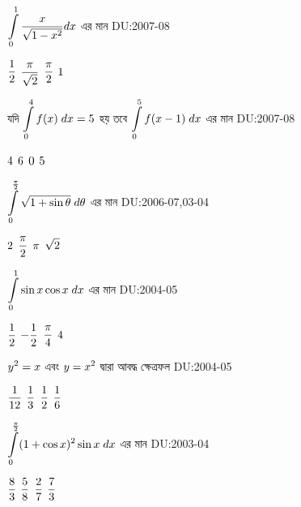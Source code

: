 \documentclass[addpoints]{exam}
\begin{document}
\begin{questions}
\question   $\mathlarger{\int\limits_{0}^{1} \frac{x}{\sqrt{1-x^2}}dx}$  এর মান  \hfill \textsc{DU:2007-08}

\begin{oneparchoices}
 \choice $\mathlarger{\frac{1}{2}}$
 \choice $\mathlarger{\frac{\pi}{\sqrt{2}}}$
\choice $\mathlarger{\frac{\pi}{2}}$
\choice $\mathlarger{1}$
\end{oneparchoices}

\question  যদি $\mathlarger{\int\limits_{0}^{4} f(x)\;dx=5}$  হয় তবে  $\mathlarger{\int\limits_{0}^{5} f(x-1)\;dx}$ এর মান  \hfill \textsc{DU:2007-08}

\begin{oneparchoices}
 \choice $\mathlarger{4}$
 \choice $\mathlarger{6}$
 \choice $\mathlarger{0}$
 \choice $\mathlarger{5}$
\end{oneparchoices}

\question   $\mathlarger{\int\limits_{0}^{\frac{\pi}{2}} \sqrt{1+\sin \theta}\; d\theta}$ এর মান \hfill \textsc{DU:2006-07,03-04}

\begin{oneparchoices}
 \choice $\mathlarger{2}$
 \choice $\mathlarger{\frac{\pi}{2}}$
\choice $\mathlarger{\pi}$
\choice $\mathlarger{\sqrt{2}}$
\end{oneparchoices}

\question   $\mathlarger{\int\limits_{0}^{1} \sin x \cos x\;dx}$  এর মান  \hfill \textsc{DU:2004-05}

\begin{oneparchoices}
 \choice $\mathlarger{\frac{1}{2}}$
 \choice $\mathlarger{-\frac{1}{2}}$
\choice $\mathlarger{\frac{\pi}{4}}$
\choice $\mathlarger{4}$
\end{oneparchoices}

\question  $\mathlarger{y^{2}=x}$  এবং $\mathlarger{y=x^2}$  দ্বারা আবদ্ধ ক্ষেত্রফল  \hfill \textsc{DU:2004-05}

\begin{oneparchoices}
 \choice $\mathlarger{\frac{1}{12}}$
 \choice $\mathlarger{\frac{1}{3}}$
 \choice $\mathlarger{\frac{1}{2}}$
 \choice $\mathlarger{\frac{1}{6}}$
\end{oneparchoices}

\question   $\mathlarger{\int\limits_{0}^{\frac{\pi}{2}} (1+\cos x)^{2}\sin x\;dx}$  এর মান \hfill \textsc{DU:2003-04}

\begin{oneparchoices}
 \choice $\mathlarger{\frac{8}{3}}$
 \choice $\mathlarger{\frac{5}{8}}$
\choice $\mathlarger{\frac{2}{7}}$
\choice $\mathlarger{\frac{7}{3}}$
\end{oneparchoices}


\end{questions}
\end{document}

